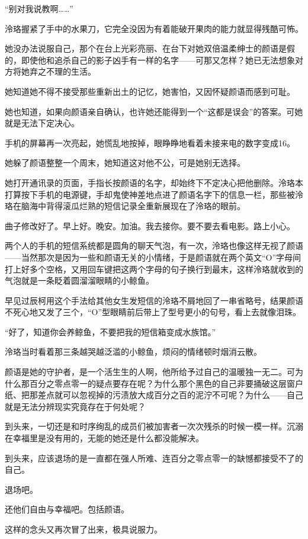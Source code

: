 \documentclass[UTF8, scheme = chinese, openany]{ctexbook}
\begin{document}
“别对我说教啊……”

泠珞握紧了手中的水果刀，它完全没因为有着能破开果肉的能力就显得残酷可怖。

她没办法说服自己，那个在台上光彩亮丽、在台下对她双倍温柔绅士的颜语是假的，即使他和追杀自己的影子凶手有一样的名字——可那又怎样？她已无法想象对方将她弃之不理的生活。

她知道她不得不接受那些重新出土的记忆，她害怕，又因怀疑颜语而感到可耻。

她也知道，如果向颜语亲自确认，也许她还能得到一个“这都是误会”的答案。可她就是无法下定决心。

手机的屏幕再一次亮起，她慌乱地按掉，眼睁睁地看着未接来电的数字变成16。

她躲了颜语整整一个周末，她知道这对他不公，可是她别无选择。

她打开通讯录的页面，手指长按颜语的名字，却始终下不定决心把他删除。泠珞本打算按下手机的电源键，手却鬼使神差地点进了颜语名字下的信息一栏，那些被泠珞在脑海中背得滚瓜烂熟的短信记录全重新展现在了泠珞的眼前。

曲子修改好了。早上好。晚安。加油。我去接你。要不要去看电影。路上小心。

两个人的手机的短信系统都是圆角的聊天气泡，有一次，泠珞也像这样无视了颜语——当然那次是因为一些和颜语无关的小情绪，于是颜语就在两个英文“O”字母间打上好多个空格，又用回车键把这两个字母的句子换行到最末，这样泠珞就收到的气泡就是一条眨着圆溜溜眼睛的小鲸鱼。

早见过辰柯用这个手法给其他女生发短信的泠珞不屑地回了一串省略号，结果颜语不死心地又发了三个，“O”型眼睛前后带上了型号更小的句号，看上去就像泪珠。

“好了，知道你会养鲸鱼，不要把我的短信箱变成水族馆。”

泠珞当时看着那三条越哭越泛滥的小鲸鱼，烦闷的情绪顿时烟消云散。

颜语是她的守护者，是一个活生生的人啊，他所给予过自己的温暖独一无二。可为什么那百分之零点零一的疑点要存在呢？为什么那个黑色的自己非要捅破这层窗户纸、把那差点就可以忽视掉的污渍放大成百分之百的泥泞不可呢？为什么——自己就是无法分辨现实究竟存在于何处呢？

到头来，一切还是和时序绚乱的成员们被加害者一次次残杀的时候一模一样。沉溺在幸福里是没有用的，无能的她还是什么都没能解决。

到头来，应该退场的是一直都在强人所难、连百分之零点零一的缺憾都接受不了的自己。

退场吧。

还他们自由与幸福吧。包括颜语。

这样的念头又再次冒了出来，极具说服力。
\end{document}
